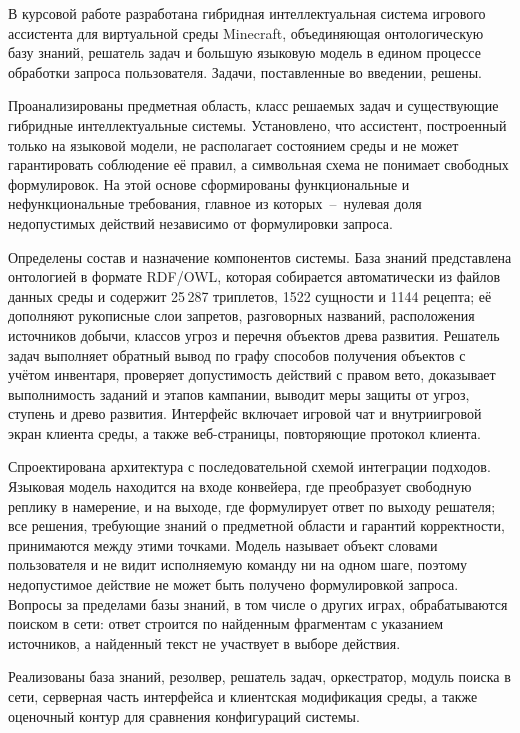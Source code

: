 
В курсовой работе разработана гибридная интеллектуальная система игрового ассистента
для виртуальной среды Minecraft, объединяющая онтологическую базу знаний, решатель задач
и большую языковую модель в едином процессе обработки запроса пользователя. Задачи,
поставленные во введении, решены.

Проанализированы предметная область, класс решаемых задач и существующие гибридные
интеллектуальные системы. Установлено, что ассистент, построенный только на языковой
модели, не располагает состоянием среды и не может гарантировать соблюдение её правил, а
символьная схема не понимает свободных формулировок. На этой основе сформированы
функциональные и нефункциональные требования, главное из которых~--~нулевая доля
недопустимых действий независимо от формулировки запроса.

Определены состав и назначение компонентов системы. База знаний представлена
онтологией в формате RDF/OWL, которая собирается автоматически из файлов данных среды и
содержит 25\,287 триплетов, 1522 сущности и 1144 рецепта; её дополняют рукописные слои
запретов, разговорных названий, расположения источников добычи, классов угроз и перечня
объектов древа развития. Решатель задач выполняет обратный вывод по графу способов
получения объектов с учётом инвентаря, проверяет допустимость действий с правом вето,
доказывает выполнимость заданий и этапов кампании, выводит меры защиты от угроз, ступень
и древо развития. Интерфейс включает игровой чат и внутриигровой экран клиента среды, а
также веб-страницы, повторяющие протокол клиента.

Спроектирована архитектура с последовательной схемой интеграции подходов. Языковая
модель находится на входе конвейера, где преобразует свободную реплику в намерение, и на
выходе, где формулирует ответ по выходу решателя; все решения, требующие знаний о
предметной области и гарантий корректности, принимаются между этими точками. Модель
называет объект словами пользователя и не видит исполняемую команду ни на одном шаге,
поэтому недопустимое действие не может быть получено формулировкой запроса. Вопросы за
пределами базы знаний, в том числе о других играх, обрабатываются поиском в сети: ответ
строится по найденным фрагментам с указанием источников, а найденный текст не участвует в
выборе действия.

Реализованы база знаний, резолвер, решатель задач, оркестратор, модуль поиска в сети,
серверная часть интерфейса и клиентская модификация среды, а также оценочный контур для
сравнения конфигураций системы.

